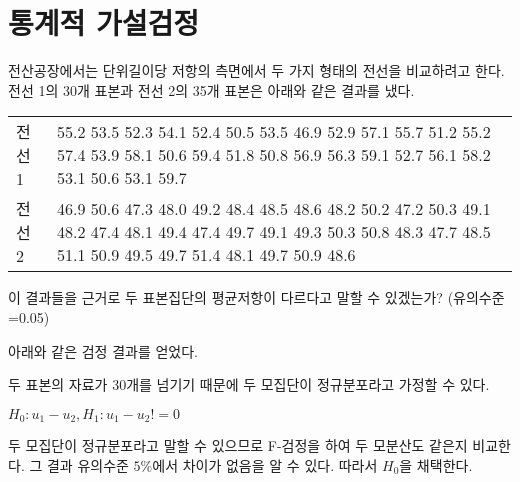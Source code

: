 \section{통계적 가설검정}
전산공장에서는 단위길이당 저항의 측면에서 두 가지 형태의 전선을 비교하려고
한다. 전선 1의 30개 표본과 전선 2의 35개 표본은 아래와 같은 결과를 냈다.

\begin{tabularx}{0.9\textwidth}{ l|X }
  \noalign{\smallskip}\hline\noalign{\smallskip}
  전선 1 & 
    55.2 53.5 52.3 54.1 52.4 50.5 53.5 46.9 52.9 57.1
    55.7 51.2 55.2 57.4 53.9 58.1 50.6 59.4 51.8 50.8
    56.9 56.3 59.1 52.7 56.1 58.2 53.1 50.6 53.1 59.7 \\
  전선 2 &
    46.9 50.6 47.3 48.0 49.2 48.4 48.5 48.6 48.2 50.2
    47.2 50.3 49.1 48.2 47.4 48.1 49.4 47.4 49.7 49.1
    49.3 50.3 50.8 48.3 47.7 48.5 51.1 50.9 49.5 49.7
    51.4 48.1 49.7 50.9 48.6
\end{tabularx}

이 결과들을 근거로 두 표본집단의 평균저항이 다르다고 말할 수 있겠는가?
{\small(유의수준=0.05)}

아래와 같은 검정 결과를 얻었다.


두 표본의 자료가 30개를 넘기기 때문에 두 모집단이 정규분포라고 가정할 수 있다.

$H_0: u_1 - u_2, H_1: u_1 - u_2 != 0$

두 모집단이 정규분포라고 말할 수 있으므로
F-검정을 하여 두 모분산도 같은지 비교한다.
그 결과 유의수준 $5\%$에서 차이가 없음을 알 수 있다.
따라서 $H_0$을 채택한다.
